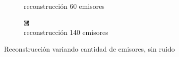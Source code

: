 \documentclass[11pt]{beamer}
\begin{document}
\begin{frame}
\begin{figure}[H]
\begin{subfigure}[h]{0.3\textwidth}
            \caption{reconstrucción 60 emisores}
            \label{fig:reconstruccion 60 emisores}
        \end{subfigure}%
        \hfill
        \begin{subfigure}[h]{0.3\textwidth} 
            \includegraphics[width=\textwidth]{img/tomo_emisores_140.png}
            \caption{reconstrucción 140 emisores}
            \label{fig:reconstruccion 140 emisores}
        \end{subfigure}
        
        \caption{Reconstrucción variando cantidad de emisores, sin ruido}
    \end{figure}
\end{frame}
    
\end{document}
